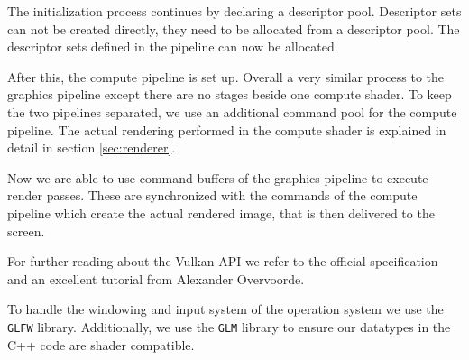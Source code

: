 \documentclass[12pt,conference]{IEEEtran}
\begin{document}
\par
The initialization process continues by declaring a descriptor pool. Descriptor sets can not be created directly, they need to be allocated from a descriptor pool. The descriptor sets defined in the pipeline can now be allocated.
\par
After this, the compute pipeline is set up. Overall a very similar process to the graphics pipeline except there are no stages beside one compute shader. To keep the two pipelines separated, we use an additional command pool for the compute pipeline. The actual rendering performed in the compute shader is explained in detail in section \ref{sec:renderer}. 
\par
Now we are able to use command buffers of the graphics pipeline to execute render passes. These are synchronized with the commands of the compute pipeline which create the actual rendered image, that is then delivered to the screen.
\par
For further reading about the Vulkan API we refer to the official specification\cite{vulkan1.0.38spec} and an excellent tutorial from Alexander Overvoorde\cite{overvoorde2016vulkan}.
\par
To handle the windowing and input system of the operation system we use the \texttt{GLFW} library\cite{loewy2016glfw}. Additionally, we use the \texttt{GLM} library\cite{creation2016glm} to ensure our datatypes in the C++ code are shader compatible.
\end{document}
